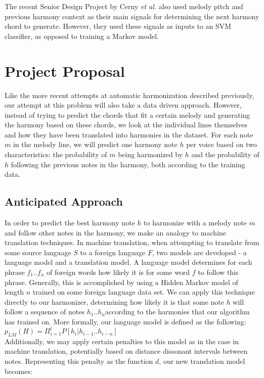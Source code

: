 \documentclass{sig-alternate}
\begin{document}
The recent Senior Design Project by Cerny \textit{et al.} \cite{UAMP} also used melody pitch and previous harmony context
as their main signals for determining the next harmony chord to generate. However, they used these
signals as inputs to an SVM classifier, as opposed to training a Markov model. 

\section{Project Proposal}
\label{sec:project_proposal}
Like the more recent attempts at automatic harmonization described previously, our attempt at this problem will also
take a data driven approach. However, instead of trying to predict the chords that fit a certain melody and generating
the harmony based on these chords, we look at the individual lines themselves and how they have been translated into
harmonies in the dataset. For each note $m$ in the melody line, we will predict one harmony note $h$ per voice
based on two characteristics: the probability of $m$ being harmonized by $h$ and the probability of $h$ following the 
previous notes in the harmony, both according to the training data.

\subsection{Anticipated Approach}
\label{subsec:approach}
In order to predict the best harmony note $h$ to harmonize with a melody note $m$ and follow other notes in the harmony,
we make an analogy to machine translation techniques. In machine translation, when attempting to translate from some source
language $S$ to a foreign language $F$, two models are developed - a language model and a translation model.
A language model determines for each phrase $f_1 .. f_n$ of foreign words how likely it is for some word $f$ to follow this phrase. 
Generally, this is accomplished by using a Hidden Markov model of length $n$ trained on some foreign language data set. We can apply 
this technique directly to our harmonizer, determining how likely it is that some note $h$ will follow a sequence of notes $h_1 .. h_n$according to the harmonies that our algorithm has trained on. More formally, our language model is defined as the following:\\

$p_{LM}(H) = \Pi_{i = 1}^{l} P[h_{i} | h_{i - 1} .. h_{i - n}]$\\

Additionally, we may apply certain penalties to this model as in the case in machine translation, potentially based on distance dissonant intervals between notes. Representing this penalty as the function $d$, our new translation model becomes:\\
\end{document}
